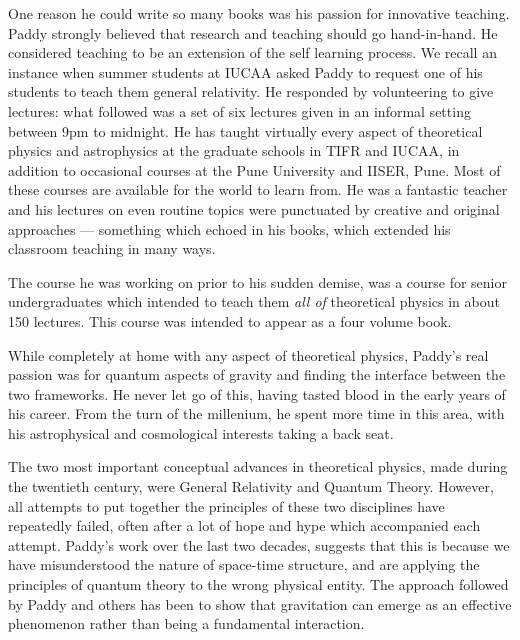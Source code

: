 \documentclass[prd, preprint, longbibliography, 12pt]{revtex4-2}
\begin{document}
One reason he could write so many books was his passion for innovative
teaching. Paddy strongly believed that research and teaching should go
hand-in-hand.
He considered teaching to be an extension of the self learning process.
We recall an instance when summer students at IUCAA asked Paddy to
request one of his students to teach them general relativity.
He responded by volunteering to give lectures: what followed was a set
of six lectures given in an informal setting between 9pm to midnight. 
He has taught virtually every aspect of theoretical physics and
astrophysics at the graduate schools in TIFR and IUCAA, in addition to
occasional courses at the Pune University and IISER, Pune.
Most of these courses are available for the world to learn from.
He was a fantastic teacher and his lectures on even routine topics
were punctuated by  creative and original approaches --- something
which echoed in his books, which extended  his classroom teaching in
many ways. 

The course he was working on  prior to his sudden demise, was a course
for senior undergraduates which intended to  teach them \textit{all
  of} theoretical physics in about 150 lectures. This course was
intended to appear as a four volume book.  

While completely at home with any aspect of theoretical physics,
Paddy's real passion was for quantum aspects of gravity and finding
the interface between the two frameworks.
He never let go of this, having tasted blood in the early years of his
career.
From the turn of the millenium, he spent more time in this area, with
his astrophysical and cosmological interests taking a back seat.  

The two most important conceptual advances in theoretical physics,
made during the twentieth century, were General Relativity and Quantum
Theory.
However, all attempts to put together the principles of these two
disciplines have repeatedly failed, often after a lot of hope and hype
which accompanied  each attempt.
Paddy's work over the last two decades, suggests that this is because
we have misunderstood the nature of space-time structure, and are
applying the principles of quantum theory to the wrong physical
entity.
The approach followed by Paddy and others has been to show that
gravitation can emerge as an effective phenomenon rather than being a
fundamental interaction. 
\end{document}
